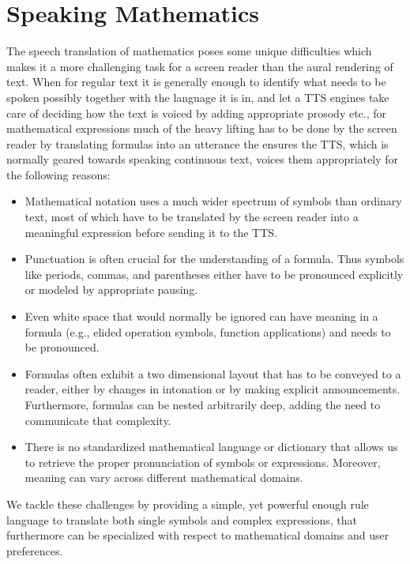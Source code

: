 \documentclass{sig-alternate}
\begin{document}
\section{Speaking Mathematics}
\label{sec:translate}

The speech translation of mathematics poses some unique difficulties which makes
it a more challenging task for a screen reader than the aural
rendering of text. When for regular text it is generally enough to identify what
needs to be spoken possibly together with the language it is in, and let a TTS
engines take care of deciding how the text is voiced by adding appropriate
prosody etc., for mathematical expressions much of the heavy lifting has to be
done by the screen reader by translating formulas into an utterance the ensures
the TTS, which is normally geared towards speaking continuous text, voices them
appropriately for the following reasons:

\begin{itemize}\itemsep-1pt
\item Mathematical notation uses a much wider spectrum of symbols than ordinary
  text, most of which have to be translated by the screen reader into a
  meaningful expression before sending it to the TTS.
\item Punctuation is often crucial for the understanding of a formula. Thus
  symbols like periods, commas, and parentheses either have to be pronounced
  explicitly or modeled by appropriate pausing. 
\item Even white space that would normally be ignored can have meaning in a
  formula (e.g., elided operation symbols, function applications) and needs
  to be pronounced.
\item Formulas often exhibit a two dimensional layout that has to be conveyed to
  a reader, either by changes in intonation or by making explicit announcements.
  Furthermore, formulas can be nested arbitrarily deep, adding the need to
  communicate that complexity.
\item There is no standardized mathematical language or dictionary that allows
  us to retrieve the proper pronunciation of symbols or expressions. Moreover,
  meaning can vary across different mathematical domains.
\end{itemize}

We tackle these challenges by providing a simple, yet powerful enough rule
language to translate both single symbols and complex expressions, that
furthermore can be specialized with respect to mathematical domains and user
preferences.
\end{document}
